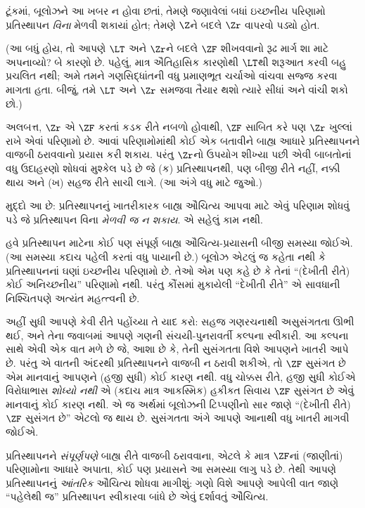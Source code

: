 ટૂંકમાં, બૂલોઝને આ ખબર ન હોવા છતાં, તેમણે જણાવેલાં
બધાં ઇચ્છનીય પરિણામો પ્રતિસ્થાપન \emph{વિના} મેળવી
શકાયાં હોત; તેમણે $\Z$ને બદલે $\Zr$ વાપરવો પડ્યો હોત.

(આ બધું હોય, તો આપણે $\LT$ અને $\Zr$ને બદલે
$\ZF$ શીખવવાનો રૂઢ માર્ગ શા માટે અપનાવ્યો? બે કારણો છે.
પહેલું, માત્ર ઐતિહાસિક કારણોથી $\LT$થી શરૂઆત કરવી
બહુ પ્રચલિત નથી; અમે તમને ગણસિદ્ધાંતની વધુ પ્રમાણભૂત
ચર્ચાઓ વાંચવા સજ્જ કરવા માગતા હતા. બીજું, તમે $\LT$
અને $\Zr$ સમજવા તૈયાર થશો ત્યારે સીધાં \citealt{Potter2004}
અને \citealt{ButtonLT1} વાંચી શકો છો.)

અલબત્ત, $\Zr$ એ $\ZF$ કરતાં કડક રીતે નબળો હોવાથી,
$\ZF$ સાબિત કરે પણ $\Zr$ ખુલ્લાં રાખે એવાં પરિણામો છે.
આવાં પરિણામોમાંથી કોઈ એક બતાવીને બાહ્ય આધારે
પ્રતિસ્થાપનને વાજબી ઠરાવવાનો પ્રયાસ કરી શકાય. પરંતુ
$\Zr$નો ઉપયોગ શીખ્યા પછી એવી બાબતોનાં વધુ ઉદાહરણો
શોધવાં મુશ્કેલ પડે છે જે (ક) પ્રતિસ્થાપનથી, પણ બીજી
રીતે નહીં, નક્કી થાય અને (ખ) સહજ રીતે સાચી લાગે.
(આ અંગે વધુ માટે \citealt[\S13.2]{Potter2004} જુઓ.)

મુદ્દો આ છે: પ્રતિસ્થાપનનું ખાતરીકારક બાહ્ય ઔચિત્ય
આપવા માટે એવું પરિણામ શોધવું પડે જે પ્રતિસ્થાપન વિના
\emph{મેળવી જ ન શકાય}. એ સહેલું કામ નથી.

હવે પ્રતિસ્થાપન માટેના કોઈ પણ સંપૂર્ણ બાહ્ય ઔચિત્ય-પ્રયાસની
બીજી સમસ્યા જોઈએ. (આ સમસ્યા કદાચ પહેલી કરતાં વધુ પાયાની
છે.) બૂલોઝ એટલું જ કહેતા નથી કે પ્રતિસ્થાપનનાં ઘણાં
ઇચ્છનીય પરિણામો છે. તેઓ એમ પણ કહે છે કે તેનાં
``(દેખીતી રીતે) કોઈ અનિચ્છનીય'' પરિણામો નથી. પરંતુ
કૌંસમાં મુકાયેલી ``દેખીતી રીતે'' એ સાવધાની નિશ્ચિતપણે
અત્યંત મહત્ત્વની છે.

અહીં સુધી આપણે કેવી રીતે પહોંચ્યા તે યાદ કરો: સહજ
ગણરચનાથી અસુસંગતતા ઊભી થઈ, અને તેના જવાબમાં આપણે
ગણની સંચયી-પુનરાવર્તી કલ્પના સ્વીકારી. આ કલ્પના સાથે
એવી એક વાત મળે છે જે, આશા છે કે, તેની સુસંગતતા વિશે
આપણને ખાતરી આપે છે. પરંતુ એ વાતની અંદરથી પ્રતિસ્થાપનને
વાજબી ન ઠરાવી શકીએ, તો $\ZF$ સુસંગત છે એમ માનવાનું
આપણને (હજી સુધી) કોઈ કારણ નથી. વધુ ચોક્કસ રીતે,
હજી સુધી કોઈએ વિરોધાભાસ \emph{શોધ્યો નથી} એ
(કદાચ માત્ર આકસ્મિક) હકીકત સિવાય $\ZF$ સુસંગત છે
એવું માનવાનું કોઈ
કારણ નથી. એ જ અર્થમાં બૂલોઝની ટિપ્પણીનો સાર જાણે
``(દેખીતી રીતે) $\ZF$ સુસંગત છે'' એટલો જ થાય છે.
સુસંગતતા અંગે આપણે આનાથી વધુ ખાતરી માગવી જોઈએ.

પ્રતિસ્થાપનને \emph{સંપૂર્ણપણે} બાહ્ય રીતે વાજબી
ઠરાવવાના, એટલે કે માત્ર $\ZF$નાં (જાણીતાં) પરિણામોના
આધારે અપાતા, કોઈ પણ પ્રયાસને આ સમસ્યા લાગુ પડે છે.
તેથી આપણે પ્રતિસ્થાપનનું \emph{આંતરિક} ઔચિત્ય શોધવા
માગીશું: ગણો વિશે આપણે આપેલી વાત જાણે ``પહેલેથી જ''
પ્રતિસ્થાપન સ્વીકારવા બાંધે છે એવું દર્શાવતું ઔચિત્ય.
\endgroup

